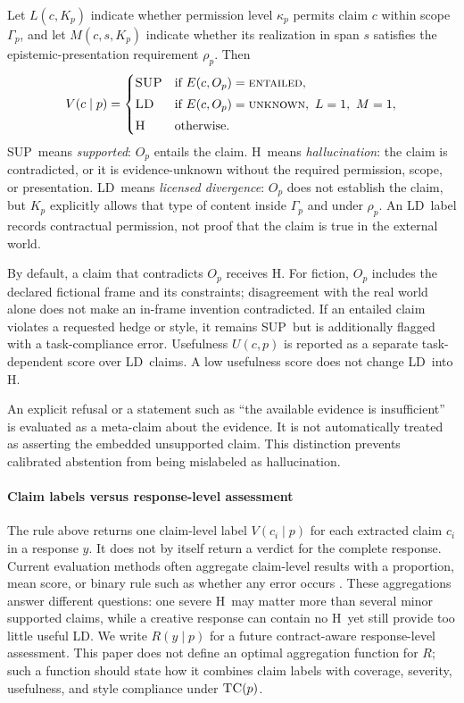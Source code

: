 \documentclass{clv2025}
\newcommand{\TC}{\textsc{TC}}
\newcommand{\LD}{\textsc{LD}}
\newcommand{\Hall}{\textsc{H}}
\newcommand{\SUP}{\textsc{SUP}}
\begin{document}
Let $L(c,K_p)$ indicate whether permission level $\kappa_p$ permits claim $c$ within scope $\Gamma_p$, and let $M(c,s,K_p)$ indicate whether its realization in span $s$ satisfies the epistemic-presentation requirement $\rho_p$.
Then
\[
V(c\mid p)=
\begin{cases}
\SUP & \text{if }E(c,O_p)=\textsc{entailed},\\[1mm]
\LD & \text{if }E(c,O_p)=\textsc{unknown},\ L=1,\ M=1,\\[1mm]
\Hall & \text{otherwise.}
\end{cases}
\]
\SUP\ means \emph{supported}: $O_p$ entails the claim.
\Hall\ means \emph{hallucination}: the claim is contradicted, or it is evidence-unknown without the required permission, scope, or presentation.
\LD\ means \emph{licensed divergence}: $O_p$ does not establish the claim, but $K_p$ explicitly allows that type of content inside $\Gamma_p$ and under $\rho_p$.
An \LD\ label records contractual permission, not proof that the claim is true in the external world.

By default, a claim that contradicts $O_p$ receives \Hall.
For fiction, $O_p$ includes the declared fictional frame and its constraints; disagreement with the real world alone does not make an in-frame invention contradicted.
If an entailed claim violates a requested hedge or style, it remains \SUP\ but is additionally flagged with a task-compliance error.
Usefulness $U(c,p)$ is reported as a separate task-dependent score over \LD\ claims.
A low usefulness score does not change \LD\ into \Hall.

An explicit refusal or a statement such as ``the available evidence is insufficient'' is evaluated as a meta-claim about the evidence.
It is not automatically treated as asserting the embedded unsupported claim.
This distinction prevents calibrated abstention from being mislabeled as hallucination.

\paragraph{Claim labels versus response-level assessment}
The rule above returns one claim-level label $V(c_i\mid p)$ for each extracted claim $c_i$ in a response $y$.
It does not by itself return a verdict for the complete response.
Current evaluation methods often aggregate claim-level results with a proportion, mean score, or binary rule such as whether any error occurs \citep{min_factscore_2023,bayat_factbench_2024}.
These aggregations answer different questions: one severe \Hall\ may matter more than several minor supported claims, while a creative response can contain no \Hall\ yet still provide too little useful \LD.
We write $R(y\mid p)$ for a future contract-aware response-level assessment.
This paper does not define an optimal aggregation function for $R$; such a function should state how it combines claim labels with coverage, severity, usefulness, and style compliance under $\TC(p)$.
\end{document}
